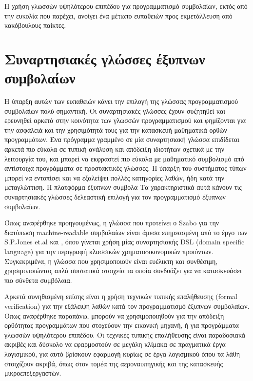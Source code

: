 Η χρήση γλωσσών υψηλότερου επιπέδου για προγραμματισμό συμβολαίων, εκτός από την ευκολία που
παρέχει, ανοίγει ένα μέτωπο ευπαθειών προς εκμετάλλευση από κακόβουλους παίκτες.




\section{Συναρτησιακές γλώσσες έξυπνων συμβολαίων} \label{dsls}


Η ύπαρξη αυτών των ευπαθειών κάνει την επιλογή της γλώσσας προγραμματισμού συμβολαίων πολύ
σημαντική. Οι συναρτησιακές γλώσσες έχουν συζητηθεί και ερευνηθεί αρκετά στην κοινότητα των
γλωσσών προγραμματισμού και φημίζονται για την ασφάλειά και την χρησιμότητά τους για την κατασκευή
μαθηματικά ορθών προγραμμάτων. Ένα πρόγραμμα γραμμένο σε μία συναρτησιακή γλώσσα επιδίδεται
αρκετά πιο εύκολα σε τυπική ανάλυση και απόδειξη ιδιοτήτων σχετικά με την λειτουργία του, και μπορεί
να εκφραστεί πιο εύκολα με μαθηματικό συμβολισμό από αντίστοιχα προγράμματα σε προστακτικές γλώσσες.
Η ύπαρξη του συστήματος τύπων μπορεί να εντοπίσει και να εξαλείψει πολλές κατηγορίες λαθών, ήδη
κατά την μεταγλώττιση. Η πλατφόρμα έξυπνων συμβολα
 Τα χαρακτηριστικά αυτά κάνουν τις συναρτησιακές γλώσσες δελεαστική
επιλογή για τον προγραμματισμό έξυπνων συμβολαίων.

Όπως αναφέρθηκε προηγουμένως,  η γλώσσα που προτείνει ο Szabo για την διατύπωση machine-readable
συμβολαίων είναι άμεσα επηρεασμένη από το έργο των S.P.Jones et.al
\cite{composingcontracts}  και \cite{howtowriteacontract}, όπου γίνεται χρήση μίας συναρτησιακής DSL
(domain specific language) για την περιγραφή κλασσικών χρηματοoικονομικών προιόντων. Συγκεκριμένα, η
γλώσσα που χρησιμοποιούν είναι ευέλικτη και συνθέσιμη, χρησιμοποιώντας απλά συστατικά στοιχεία τα
οποία συνδυάζει για να κατασκευάσει πιο σύνθετα συμβόλαια.

Αρκετά συνηθισμένη επίσης είναι η χρήση τεχνικών τυπικής επαλήθευσης (formal verification) για
την εξάλειψη λαθών κατά τον προγραμματισμό έξυπνων συμβολαίων. Όπως αναφέρθηκε παραπάνω,
μπορούν να χρησιμοποιηθούν για την απόδειξη ορθότητας προγραμμάτων που στοχεύουν
την εικονική μηχανή, ή για προγράμματα γλωσσών υψηλότερου επιπέδου.
Οι τεχνικές τυπικής επαλήθευσης
είναι παραδοσιακά ακριβές και δύσκολο να εφαρμοστούν σε μεγάλη κλίμακα σε πραγματικά έργα
λογισμικού, για αυτό βρίσκουν εφαρμογή κυρίως σε έργα λογισμικού όπου τα λάθη στοιχίζουν ακριβά,
όπως στον τομέα της αεροναυπηγικής και της κατασκευής μικροεπεξεργαστών.

